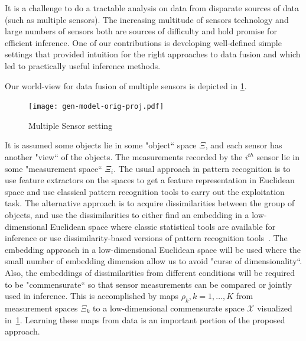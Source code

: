 \documentclass[12pt,oneside,final]{thesis}\usepackage[]{graphicx}\usepackage[]{color}
\begin{document}
 It is a challenge  to do a tractable analysis on data from disparate sources of data (such as multiple sensors). The increasing multitude  of sensors technology and large numbers of sensors both are  sources of difficulty and hold promise for efficient inference. One of our contributions is developing well-defined simple settings that provided intuition for the right approaches to data fusion and which led to practically useful inference methods.
 
 Our world-view for data fusion of multiple sensors is depicted in \ref{fig:gen-model}.
 
\begin{figure}
\centering
\texttt{[image: gen-model-orig-proj.pdf]}
\caption{Multiple Sensor setting}
\label{fig:gen-model}
\end{figure}

It is assumed some objects lie in some "object`` space $\Xi$, and each sensor has another "view`` of the objects. The measurements recorded by the $i^{th}$ sensor lie in some "measurement space`` $\Xi_i$. The usual approach in pattern recognition is to use feature extractors on the spaces to get a feature representation in Euclidean space and use classical pattern recognition tools to carry out the exploitation task. The alternative approach is to acquire dissimilarities between the group of objects, and use the dissimilarities to either find an embedding in a low-dimensional Euclidean space where classic statistical tools are available for inference or use dissimilarity-based versions of pattern recognition tools~\cite{duin2005dissimilarity}. The embedding approach in a  low-dimensional Euclidean space will be used where the small number of embedding dimension allow us to avoid "curse of dimensionality``. Also, the embeddings of dissimilarities from  different conditions will be required to be "commensurate`` so that sensor measurements can be compared or jointly used in inference. This is accomplished by maps $\rho_k,k=1,\ldots,K$ from measurement spaces $\Xi_k$ to a low-dimensional commensurate space $\mathcal{X}$ visualized in~\ref{fig:gen-model}. Learning these maps from data is  an important portion of the proposed  approach.
\label{sec:data}
\end{document}
